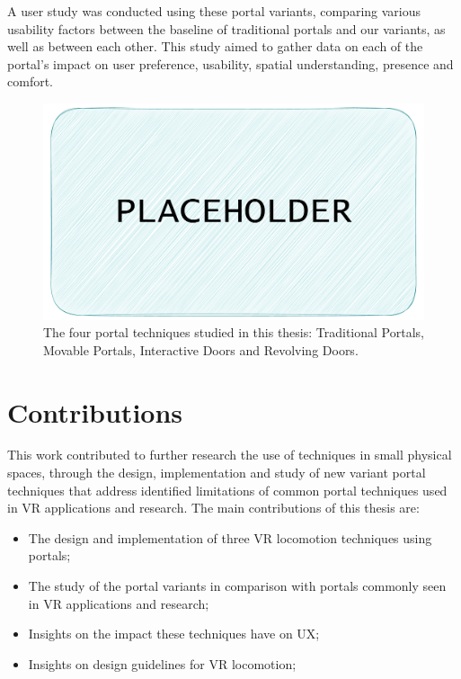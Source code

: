 A user study was conducted using these portal variants, comparing various usability factors between the baseline of traditional portals and our variants, 
as well as between each other. This study aimed to gather data on each of the portal's impact on user preference, usability, spatial understanding,
presence and comfort. 

\begin{figure}[t]
    \centering
     \includegraphics[width=.75\textwidth]{NOVAthesisFiles/Images/placeholder.pdf}
     \caption[The four portal techniques studied in this thesis]
     {The four portal techniques studied in this thesis: Traditional Portals, Movable Portals, Interactive Doors and Revolving Doors.}
     \label{fig:portal}
\end{figure}

\section{Contributions}
\label{sec:contributions}

This work contributed to further research the use of  techniques in small physical spaces, through the design, 
implementation and study of new variant portal techniques that address identified limitations of common portal techniques used in 
\gls{VR} applications and research. The main contributions of this thesis are:

\begin{itemize}
    \item The design and implementation of three \gls{VR} locomotion techniques using portals;
    
    \item The study of the portal variants in comparison with portals commonly seen in \gls{VR} applications and research;
    
    \item Insights on the impact these techniques have on \gls{UX};
    
    \item Insights on design guidelines for \gls{VR} locomotion;
\end{itemize}


